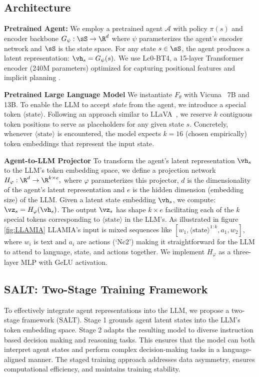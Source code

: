 \documentclass{article}
\theoremstyle{plain}
\theoremstyle{definition}
\theoremstyle{remark}
\begin{document}
\subsection{Architecture}
\textbf{Pretrained Agent:} 
We employ a pretrained agent $\mathcal{A}$ with policy $\pi(s)$ and encoder backbone \(G_{\psi}: \sS \rightarrow \R^{d}\) where $\psi$ parameterizes the agent's encoder network and $\sS$ is the state space. For any state $s \in \sS$, the agent produces a latent representation: \(\vh_{s} = G_{\psi}(s).\) We use Lc0-BT4, a 15-layer Transformer encoder (240M parameters) optimized for capturing positional features and implicit planning \cite{jenner2024evidence}.

\textbf{Pretrained Large Language Model} We instantiate $F_{\theta}$ with Vicuna~\cite{zheng2023judging} 7B and 13B. To enable the LLM to accept \emph{state} from the agent, we introduce a special token $\langle\text{state}\rangle$. Following an approach similar to LLaVA~\cite{liu2023visual}, we reserve $k$ contiguous token positions to serve as placeholders for any given state $s$. Concretely, whenever $\langle\text{state}\rangle$ is encountered, the model expects $k=16$ (chosen empirically) token embeddings that represent the input state.

\textbf{Agent-to-LLM Projector}
To transform the agent's latent representation $\vh_{s}$ to the LLM's token embedding space, we define a projection network \(H_{\varphi}: \R^{d} \to \R^{k \times e},\) where $\varphi$ parameterizes this projector, $d$ is the dimensionality of the agent's latent representation and $e$ is the hidden dimension (embedding size) of the LLM. Given a latent state embedding $\vh_{s}$, we compute: \(\vz_{s} = H_{\varphi}(\vh_{s})\). The output $\vz_{s}$ has shape $k \times e$ facilitating each of the $k$ special tokens corresponding to $\langle\text{state}\rangle$ in the LLM's. As illustrated in figure \ref{fig:LLAMIA} LLAMIA's input is 
mixed sequences like \([w_1, \langle\text{state}\rangle^{1:k}, a_1, w_2]\), where \(w_i\) is text and \(a_i\) are actions (`Nc2') making it straightforward for the LLM to attend to language, state, and actions together. We implement $H_{\varphi}$ as a three-layer MLP with GeLU activation.

\subsection{SALT: Two-Stage Training Framework}  
To effectively integrate agent representations into the LLM, we propose a two-stage framework (SALT). Stage 1 grounds agent latent states into the LLM's token embedding space. Stage 2 adapts the resulting model to diverse instruction based decision making and reasoning tasks. This ensures that the model can both interpret agent states and perform complex decision-making tasks in a language-aligned manner. The staged training approach addresses data asymmetry, ensures computational efficiency, and maintains training stability.
\end{document}
